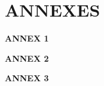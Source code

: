 \documentclass[12pt,a4paper,oneside]{report}
\begin{document}






\newpage


\appendix

\renewcommand{\appendixname}{ANNEXES}%
\chapter*{\appendixname}

 \thispagestyle{empty}
 



\textbf{ANNEX 1} 

 \textbf{ANNEX 2} 
 
 \textbf{ANNEX 3} 
 


\end{document}
